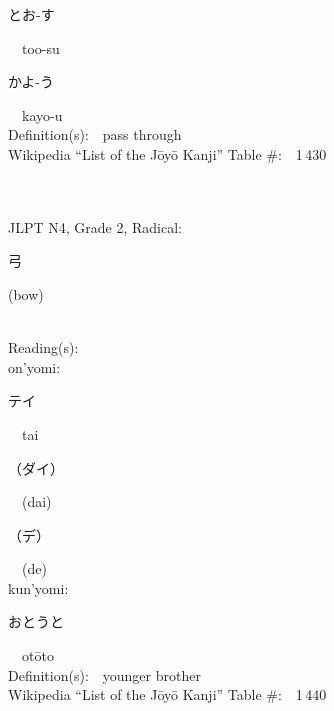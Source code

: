 \begin{multicols}{2}
{\hspace*{2em}}{\begin{CJK}{UTF8}{min} とお-す \end{CJK}}\ \ too-su\ \ \\
{\hspace*{2em}}{\begin{CJK}{UTF8}{min} かよ-う \end{CJK}}\ \ kayo-u\ \ \\
Definition(s):\ \ pass through \\
Wikipedia ``List of the J\=oy\=o Kanji'' Table \#:\ \ 1\,430 \\
\ \ \\
{\fontsize{34pt}{40pt}  }\ \ \\  %
{JLPT N4, Grade 2, Radical:\ \ {\begin{CJK}{UTF8}{min} 弓 \end{CJK}} (bow) } \\
Reading(s):\ \ \\
{\hspace*{1em}}on'yomi:\ \ \\
{\hspace*{2em}}{\begin{CJK}{UTF8}{min} テイ \end{CJK}}\ \ tai\ \ \\
{\hspace*{2em}}{\begin{CJK}{UTF8}{min} （ダイ） \end{CJK}}\ \ (dai)\ \ \\
{\hspace*{2em}}{\begin{CJK}{UTF8}{min} （デ） \end{CJK}}\ \ (de)\ \ \\
{\hspace*{1em}}kun'yomi:\ \ \\
{\hspace*{2em}}{\begin{CJK}{UTF8}{min} おとうと \end{CJK}}\ \ ot\=oto\ \ \\
Definition(s):\ \ younger brother \\
Wikipedia ``List of the J\=oy\=o Kanji'' Table \#:\ \ 1\,440 \\
\ \ \\

\end{multicols}
